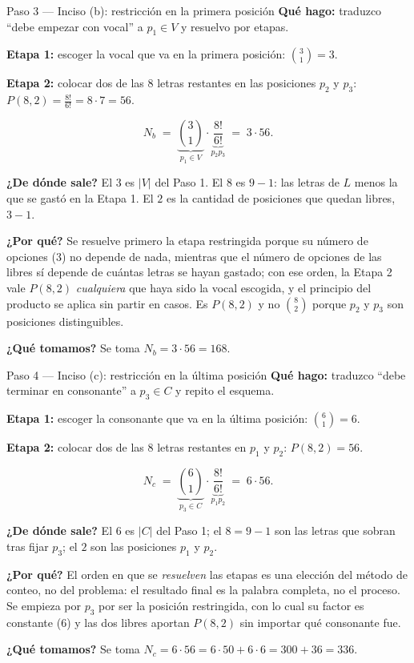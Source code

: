 \documentclass[11pt]{article}
\begin{document}
\begin{paso}{Paso 3 --- Inciso (b): restricción en la primera posición}
\textbf{Qué hago:} traduzco ``debe empezar con vocal'' a $p_1\in V$ y resuelvo por etapas.

\medskip
\textbf{Etapa 1:} escoger la vocal que va en la primera posición: $\displaystyle\binom{3}{1}=3$.

\textbf{Etapa 2:} colocar dos de las $8$ letras restantes en las posiciones $p_2$ y $p_3$: $\displaystyle P(8,2)=\frac{8!}{6!}=8\cdot 7=56$.

\medskip
\[
  N_b \;=\; \underbrace{\binom{3}{1}}_{p_1\in V} \cdot \underbrace{\frac{8!}{6!}}_{p_2p_3} \;=\; 3\cdot 56 .
\]

\textbf{¿De dónde sale?} El $3$ es $|V|$ del Paso 1. El $8$ es $9-1$: las letras de $L$ menos la que se gastó en la Etapa 1. El $2$ es la cantidad de posiciones que quedan libres, $3-1$.

\textbf{¿Por qué?} Se resuelve primero la etapa restringida porque su número de opciones ($3$) no depende de nada, mientras que el número de opciones de las libres sí depende de cuántas letras se hayan gastado; con ese orden, la Etapa 2 vale $P(8,2)$ \emph{cualquiera} que haya sido la vocal escogida, y el principio del producto se aplica sin partir en casos. Es $P(8,2)$ y no $\binom{8}{2}$ porque $p_2$ y $p_3$ son posiciones distinguibles.

\textbf{¿Qué tomamos?} Se toma $N_b = 3\cdot 56 = 168$.
\end{paso}

\begin{paso}{Paso 4 --- Inciso (c): restricción en la última posición}
\textbf{Qué hago:} traduzco ``debe terminar en consonante'' a $p_3\in C$ y repito el esquema.

\medskip
\textbf{Etapa 1:} escoger la consonante que va en la última posición: $\displaystyle\binom{6}{1}=6$.

\textbf{Etapa 2:} colocar dos de las $8$ letras restantes en $p_1$ y $p_2$: $\displaystyle P(8,2)=56$.

\medskip
\[
  N_c \;=\; \underbrace{\binom{6}{1}}_{p_3\in C} \cdot \underbrace{\frac{8!}{6!}}_{p_1p_2} \;=\; 6\cdot 56 .
\]

\textbf{¿De dónde sale?} El $6$ es $|C|$ del Paso 1; el $8=9-1$ son las letras que sobran tras fijar $p_3$; el $2$ son las posiciones $p_1$ y $p_2$.

\textbf{¿Por qué?} El orden en que se \emph{resuelven} las etapas es una elección del método de conteo, no del problema: el resultado final es la palabra completa, no el proceso. Se empieza por $p_3$ por ser la posición restringida, con lo cual su factor es constante ($6$) y las dos libres aportan $P(8,2)$ sin importar qué consonante fue.

\textbf{¿Qué tomamos?} Se toma $N_c = 6\cdot 56 = 6\cdot 50 + 6\cdot 6 = 300+36 = 336$.
\end{paso}
\end{document}
